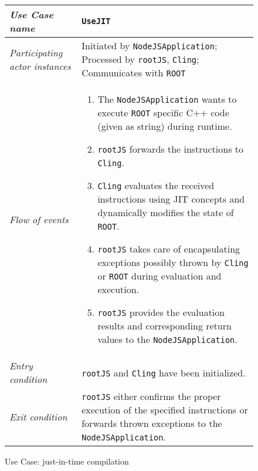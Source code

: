 \begin{figure}[htb]
	\centering
	\begin{longtable}{p{3cm} @{\hskip 1cm} p{12cm}}
		\hline

		\textit{Use Case name} & \texttt{UseJIT}\\
		\hline

		\textit{Participating actor instances} & Initiated by \texttt{NodeJSApplication}; Processed by \texttt{rootJS}, \texttt{Cling}; Communicates with \texttt{ROOT}\\
		\hline

		\textit{Flow of events} &
		\begin{enumerate}
			\item The \texttt{NodeJSApplication} wants to execute \texttt{ROOT} specific C++ code (given as string) during runtime.

			\item \texttt{rootJS} forwards the instructions to \texttt{Cling}.

			\item \texttt{Cling} evaluates the received instructions using JIT concepts and dynamically modifies the state of \texttt{ROOT}.

			\item \texttt{rootJS} takes care of encapsulating exceptions possibly thrown by \texttt{Cling} or \texttt{ROOT} during evaluation and execution.

			\item \texttt{rootJS} provides the evaluation results and corresponding return values to the \texttt{NodeJSApplication}.
		\end{enumerate}
		\\
		\hline

		\textit{Entry condition} & \texttt{rootJS} and \texttt{Cling} have been initialized.\\
		\hline

		\textit{Exit condition} & \texttt{rootJS} either confirms the proper execution of the specified instructions or forwards thrown exceptions to the \texttt{NodeJSApplication}.\\
		\hline
	\end{longtable}

	\caption{Use Case: just-in-time compilation}
\end{figure}
